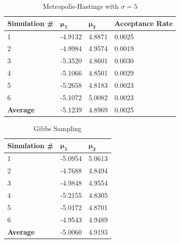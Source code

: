 \begin{table}[h]
	\centering
	\begin{tabular}{|l|l|l|l|}
		\hline
		\textbf{Simulation \#} & $\mathbf{\mu_1}$     & $\mathbf{\mu_2}$    & \textbf{Acceptance Rate} \\ \hline
		1             & -4.9132 & 4.8871 & 0.0025          \\ \hline
		2             & -4.9984 & 4.9574 & 0.0019          \\ \hline
		3             & -5.3520 & 4.8601 & 0.0030          \\ \hline
		4             & -5.1066 & 4.8501 & 0.0029          \\ \hline
		5             & -5.2658 & 4.8183 & 0.0023          \\ \hline
		6             & -5.1072 & 5.0082 & 0.0023          \\ \hline
		\textbf{Average}       & -5.1239 & 4.8969 & 0.0025          \\ \hline
	\end{tabular}
	\caption{Metropolis-Hastings with $\sigma = 5$}
	\label{mh-table-5}
\end{table}

\begin{table}[h]
	\centering
	\begin{tabular}{|l|l|l|}
		\hline
		\textbf{Simulation \#} & $\mathbf{\mu_1}$     & $\mathbf{\mu_2}$    \\ \hline
		1 & -5.0954 & 5.0613 \\ \hline
		2 & -4.7688 & 4.8494 \\ \hline
		3 & -4.9848 & 4.9554 \\ \hline
		4 & -5.2155 & 4.8305 \\ \hline
		5 & -5.0172 & 4.8701 \\ \hline
		6 & -4.9543 & 4.9489 \\ \hline
		\textbf{Average} & -5.0060   & 4.9193 \\ \hline
	\end{tabular}
	\caption{Gibbs Sampling}
	\label{gibbs-table}
\end{table}

